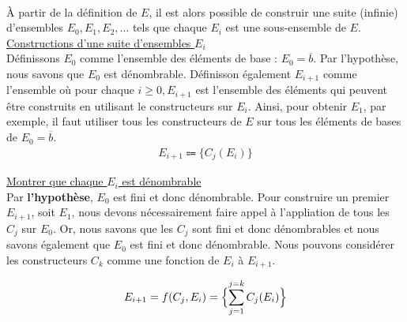 \documentclass[16pt]{report}
\begin{document}
\begin{multicols*}{2}
\begin{Preuve}{}{}
            \paragraph{}
            À partir de la définition de $E$, il est alors possible de construir une suite (infinie)
            d'ensembles $E_0, E_1, E_2, \dots$ tels que chaque $E_i$ est une sous-ensemble de $E$. 
            \vspace{1em}\\
            \underline{Constructions d'une suite d'ensembles $E_i$}
            \vspace{1em}\\
            Définissons $E_0$ comme l'ensemble des éléments de base : $E_0 = \overline{b}$. Par l'hypothèse, 
            nous savons que $E_0$ est dénombrable. Définisson également $E_{i+1}$ comme l'ensemble  
            où pour chaque $i \geq 0, E_{i+1}$ est l'ensemble des éléments qui peuvent 
            être construits en utilisant le constructeurs sur $E_i$. Ainsi, pour obtenir $E_1$, par exemple, 
            il faut utiliser tous les constructeurs de $E$ sur tous les éléments de bases de $E_0 = \overline{b}$. 
            \begin{align}
                E_{i+1} \Coloneqq \{ C_j(E_i) \} \label{ C_j(E_i)}                           
            \end{align}
                        

            \underline{Montrer que chaque $E_i$ est dénombrable}
            \vspace{1em}\\
            Par \textbf{l'hypothèse}, $E_0$ est fini et donc dénombrable. Pour construire un premier $E_{i+1}$, soit 
            $E_1$, nous devons nécessairement faire appel à l'appliation de tous les $C_j$ sur $E_0$. 
            Or, nous savons que les $C_j$ sont fini et donc dénombrables et nous savons également que $E_0$ 
            est fini et donc dénombrable. Nous pouvons considérer les constructeurs $C_k$ comme une
            fonction de $E_{i}$ à $E_{i+1}$. 

            \begin{align}
                E_{i+1} = f(C_j, E_i) = \Bigl\{ \sum_{j=1}^{j=k}C_j(E_i) \Bigr\} \label{f(C_j, E_i)}
            \end{align}


\end{Preuve}
\end{multicols*}
\end{document}
